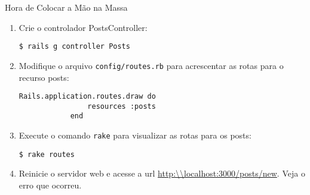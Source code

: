 \begin{frame}{Hora de Colocar a Mão na Massa}
\begin{enumerate}
		\item Crie o controlador PostsController:
		\begin{lstlisting}[style=BashInputBasicStyle]
			$ rails g controller Posts 		
		\end{lstlisting}

		\item Modifique o arquivo \verb|config/routes.rb| para acrescentar as rotas para
		o recurso posts:
		\begin{lstlisting}[style=RubyInputStyle]
			Rails.application.routes.draw do 
				resources :posts
			end 
		\end{lstlisting}	
		
		\item Execute o comando \verb!rake! para visualizar as rotas para os
		posts:
		\begin{lstlisting}[style=BashInputBasicStyle]
			$ rake routes
		\end{lstlisting}
		
		\item Reinicie o servidor web e acesse a url \url{http:\\localhost:3000/posts/new}. Veja o erro que ocorreu.

	\end{enumerate}
\end{frame}